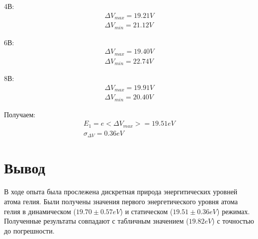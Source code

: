 \documentclass[12pt,a4paper]{article}
\begin{document}
\begin{enumerate}
\begin{itemize}
\begin{minipage}{0.3\textwidth}
	\item 4В:
	\begin{eqnarray*}
		\Delta V_{max} = 19.21V \\
		\Delta V_{min} = 21.12V
	\end{eqnarray*}
\end{minipage}
\begin{minipage}{0.3\textwidth}
  	\item 6В:
	\begin{eqnarray*}
		\Delta V_{max} = 19.40V \\
		\Delta V_{min} = 22.74V
	\end{eqnarray*}
\end{minipage}
\begin{minipage}{0.3\textwidth}
	\item 8В:
	\begin{eqnarray*}
		\Delta V_{max} = 19.91V \\
		\Delta V_{min} = 20.40V
	\end{eqnarray*}
\end{minipage}

\end{itemize}

Получаем:
\begin{eqnarray*}
E_1 = e <\Delta V_{max}> = 19.51 eV \\
\sigma_{\Delta V} = 0.36 eV
\end{eqnarray*}

\end{enumerate}

\newpage
\section{Вывод}
В ходе опыта была прослежена дискретная природа энергитических уровней атома гелия. Были получены значения первого энергетического уровня атома гелия в динамическом ($19.70 \pm 0.57 eV$) и статическом ($19.51 \pm 0.36 eV$) режимах. Полученные результаты совпадают с табличным значением ($19.82 eV$) с точностью до погрешности.
\end{document}
